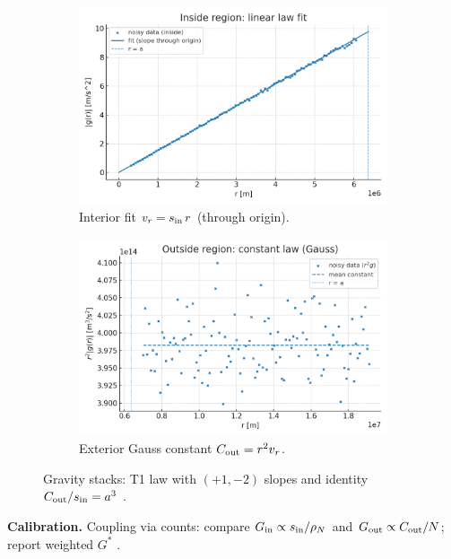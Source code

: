 \documentclass[12pt,a4paper,oneside]{scrreprt}
\def\;{}%
\begin{document}
\begin{figure}[htbp]
  \vspace{0.6em}
  \begin{subfigure}[t]{0.49\linewidth}
    \includegraphics[width=\linewidth]{fig/gravity_inside_fit.png}
    \caption{Interior fit $\;v_r=s_{\rm in}\,r\;$ (through origin).}
    \label{fig:grav:inside}
  \end{subfigure}\hfill
  \begin{subfigure}[t]{0.49\linewidth}
    \includegraphics[width=\linewidth]{fig/gravity_outside_constant.png}
    \caption{Exterior Gauss constant $C_{\rm out}=r^2 v_r$.}
    \label{fig:grav:cout}
  \end{subfigure}
  \caption{Gravity stacks: T1 law with $(+1,-2)$ slopes and identity
  $C_{\rm out}/s_{\rm in}=a^3$ \cite{PoissonWill2014,BinneyTremaine2008}.}
  \label{fig:grav:t1}
\end{figure}

\noindent\textbf{Calibration.} 
Coupling via counts: compare $G_{\rm in}\propto s_{\rm in}/\rho_N$ and
$G_{\rm out}\propto C_{\rm out}/N$; report weighted $G^*$
\cite{MisnerThorneWheeler1973,Einstein1915}.
\end{document}
